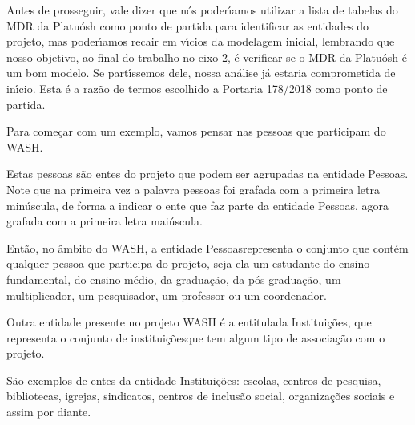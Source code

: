 \documentclass[
12pt,		%
openright,	%
twoside,  %
a4paper,			%
chapter=TITLE,		%
english,			%
french,				%
spanish,			%
brazil				%
]{USPSC-classe/USPSC}
\begin{document}
Antes de prosseguir, vale dizer que n\'os poder\'{\i}amos utilizar a lista de tabelas do MDR da Platu\'osh como ponto de partida para identificar as entidades do projeto, mas poder\'{\i}amos recair em v\'{\i}cios da modelagem inicial, lembrando que nosso objetivo, ao final do trabalho no eixo 2, \'e verificar se o MDR da Platu\'osh \'e um bom modelo. Se part\'{\i}ssemos dele, nossa an\'alise j\'a estaria comprometida de in\'{\i}cio. Esta \'e a raz\~ao de termos escolhido a Portaria 178/2018 como ponto de partida.










Para come\c{c}ar com um exemplo, vamos pensar nas \textquotedbl pessoas que participam do WASH\textquotedbl .










Estas pessoas s\~ao entes do projeto que podem ser agrupadas na entidade \textquotedbl Pessoas\textquotedbl . Note que na primeira vez a palavra pessoas foi grafada com a primeira letra min\'uscula, de forma a indicar o ente que faz parte da entidade \textquotedbl Pessoas\textquotedbl , agora grafada com a primeira letra mai\'uscula.










Ent\~ao, no \^ambito do WASH, a entidade \textquotedbl Pessoas\textquotedbl  representa o conjunto que cont\'em qualquer pessoa que participa do projeto, seja ela um estudante do ensino fundamental, do ensino m\'edio, da gradua\c{c}\~ao, da p\'os-gradua\c{c}\~ao, um multiplicador, um pesquisador, um professor ou um coordenador.










Outra entidade presente no projeto WASH \'e a entitulada \textquotedbl Institui\c{c}\~oes\textquotedbl , que representa o conjunto de \textquotedbl institui\c{c}\~oes\textquotedbl  que tem algum tipo de associa\c{c}\~ao com o projeto.










S\~ao exemplos de entes da entidade \textquotedbl Institui\c{c}\~oes\textquotedbl : escolas, centros de pesquisa, bibliotecas, igrejas, sindicatos, centros de inclus\~ao social, organiza\c{c}\~oes sociais e assim por diante.
\end{document}
